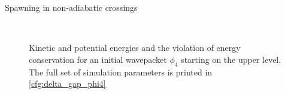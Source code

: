 \begin{chapter}{Spawning in non-adiabatic crossings}
\begin{figure}[h!]
  \centering
   \\
  \caption[Energies for a $\phi_4$ in an avoided crossing]{
  Kinetic and potential energies and the violation of energy conservation for an
  initial wavepacket $\phi_4$ starting on the upper level. The full set of simulation
  parameters is printed in \ref{cfg:delta_gap_phi4}
  \label{fig:basic_delta_gap_phi4_energies}
  }
\end{figure}




\end{chapter}
